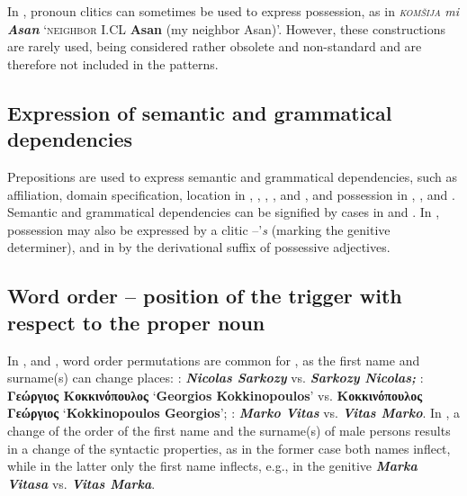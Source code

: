 \documentclass[output=paper]{langsci/langscibook}
\newcommand{\trigger}[1]{\textsc{#1}}
\begin{document}
{In , pronoun clitics can sometimes be used to express possession,
as in \textit{\trigger{komšija}} \textit{mi }\textbf{\textit{Asan}}
‘\trigger{neighbor} I.CL \textbf{Asan }(my neighbor Asan)’. However,
these constructions are rarely used, being considered rather obsolete
and non-standard and are therefore not included in the patterns.

\subsection{Expression of semantic and grammatical dependencies} %

Prepositions are used to express semantic and grammatical dependencies,
such as affiliation, domain specification, location in ,
, , , and , and possession in ,
, and . Semantic and grammatical dependencies can be
signified by cases in  and . In , possession may
also be expressed by a clitic –’\textit{s }(marking the genitive
determiner), and in  by the derivational suffix of possessive
adjectives.


\subsection{Word order – position of the trigger with respect to the proper noun} %


In ,  and , word order permutations are common for
, as the first name and surname(s) can change places: :
\textbf{\textit{Nicolas Sarkozy}} vs. \textbf{\textit{Sarkozy
Nicolas;}} : \textbf{Γεώργιος Κοκκινόπουλος}
‘\textbf{Georgios Kokkinopoulos}’ vs. \textbf{Κοκκινόπουλος
Γεώργιος} ‘\textbf{Kokkinopoulos Georgios}’; : \textbf{\textit{Marko
Vitas}} vs. \textbf{\textit{Vitas Marko}}. In , a change of the
order of the first name and the surname(s) of male persons results in a
change of the syntactic properties, as in the former case both names
inflect, while in the latter only the first name inflects, e.g., in the
genitive \textbf{\textit{Marka Vitasa}} vs. \textbf{\textit{Vitas
Marka}}.



}
\end{document}
